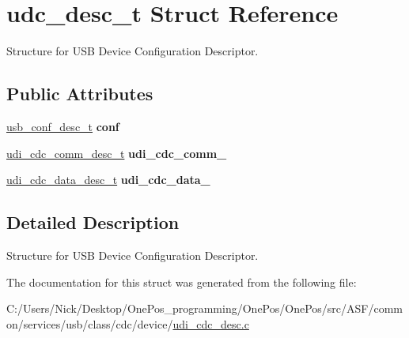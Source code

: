 \hypertarget{structudc__desc__t}{\section{udc\-\_\-desc\-\_\-t Struct Reference}
\label{structudc__desc__t}
}


Structure for U\-S\-B Device Configuration Descriptor.  


\subsection*{Public Attributes}
\begin{DoxyCompactItemize}
\item 
\hypertarget{structudc__desc__t_ad10c40160370f9b60fe6ae7a2b9343e4}{\hyperlink{structusb__conf__desc__t}{usb\-\_\-conf\-\_\-desc\-\_\-t} {\bfseries conf}}\label{structudc__desc__t_ad10c40160370f9b60fe6ae7a2b9343e4}

\item 
\hypertarget{structudc__desc__t_a80e39afa861b981ebf1ed0205eaac3f2}{\hyperlink{structudi__cdc__comm__desc__t}{udi\-\_\-cdc\-\_\-comm\-\_\-desc\-\_\-t} {\bfseries udi\-\_\-cdc\-\_\-comm\-\_}}\label{structudc__desc__t_a80e39afa861b981ebf1ed0205eaac3f2}

\item 
\hypertarget{structudc__desc__t_a13e2f562d73cf72d5b94e30d5250c46d}{\hyperlink{structudi__cdc__data__desc__t}{udi\-\_\-cdc\-\_\-data\-\_\-desc\-\_\-t} {\bfseries udi\-\_\-cdc\-\_\-data\-\_}}\label{structudc__desc__t_a13e2f562d73cf72d5b94e30d5250c46d}

\end{DoxyCompactItemize}


\subsection{Detailed Description}
Structure for U\-S\-B Device Configuration Descriptor. 

The documentation for this struct was generated from the following file\-:\begin{DoxyCompactItemize}
\item 
C\-:/\-Users/\-Nick/\-Desktop/\-One\-Pos\-\_\-programming/\-One\-Pos/\-One\-Pos/src/\-A\-S\-F/common/services/usb/class/cdc/device/\hyperlink{udi__cdc__desc_8c}{udi\-\_\-cdc\-\_\-desc.\-c}\end{DoxyCompactItemize}
